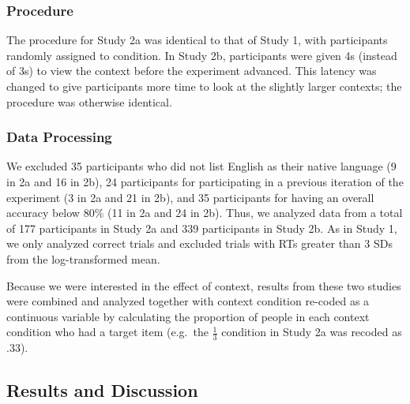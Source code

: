 \documentclass[10pt,letterpaper]{article}
\begin{document}
\subsubsection{Procedure}
 The procedure for Study 2a was identical to that of Study 1, with participants randomly assigned to condition.   In Study 2b, participants were given 4s (instead of 3s) to view the context before the experiment advanced.  This latency was changed to give participants more time to look at the slightly larger contexts; the procedure was otherwise identical.
 
 \subsubsection{Data Processing}
We excluded 35 participants who did not list English as their native language (9 in 2a and 16 in 2b), 24 participants for participating in a previous iteration of the experiment (3 in 2a and 21 in 2b), and 35 participants for having an overall accuracy below 80\% (11 in 2a and 24 in 2b).  Thus, we analyzed data from a total of 177 participants in Study 2a and 339 participants in Study 2b. As in Study 1, we only analyzed correct trials and excluded trials with RTs greater than 3 SDs from the log-transformed mean. 

Because we were interested in the effect of context, results from these two studies were combined and analyzed together with context condition re-coded as a continuous variable by calculating the proportion of people in each context condition who had a target item (e.g.\ the $\frac{1}{3}$ condition in Study 2a was recoded as .33). 

\subsection{Results and Discussion}
\end{document}
